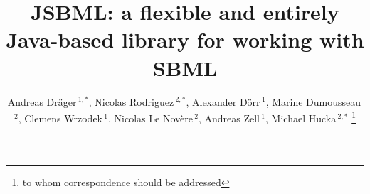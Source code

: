 \documentclass{bioinfo}
\begin{document}
\application
\title[JSBML: The Java library for SBML]{JSBML: a  flexible and entirely Java-based library for working with SBML}
\author[Dr\"ager \textit{et~al.}]{Andreas Dr\"ager\,$^{1,*}$,  
Nicolas Rodriguez\,$^{2,*}$, 
Alexander D\"orr\,$^{1}$, 
Marine Dumousseau\,$^{2}$, 
Clemens Wrzodek\,$^{1}$, 
Nicolas Le Nov\`{e}re\,$^{2}$, 
Andreas Zell\,$^{1}$, 
Michael Hucka\,$^{2,*}$
\footnote{to whom correspondence should be addressed}}
\address{$^{1}$Center for Bioinformatics Tuebingen, University of Tuebingen, T\"ubingen, Germany.\\
$^{2}$European Bioinformatics Institute, Wellcome Trust Genome Campus, Hinxton, Cambridge, UK\\
$^{3}$Computing and Mathematical Sciences, California Institute of Technology, Pasadena, CA, USA}



\maketitle
\end{document}
